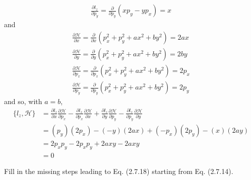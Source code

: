 \documentclass[../principles-of-quantum-mechanics.tex]{subfiles}
\begin{document}
\begin{questions}
\begin{solution}
\begin{gather*}
				\frac{\partial l_z}{\partial p_y} = \frac{\partial}{\partial p_y}(xp_y - yp_x) = x
			\end{gather*}
			and
			\begin{gather*}
				\frac{\partial \mathcal{H}}{\partial x} = \frac{\partial}{\partial x}(p_x^2 + p_y^2 + ax^2 + by^2) = 2ax \\
				\frac{\partial \mathcal{H}}{\partial y} = \frac{\partial}{\partial y}(p_x^2 + p_y^2 + ax^2 + by^2) = 2by \\
				\frac{\partial \mathcal{H}}{\partial p_x} = \frac{\partial}{\partial p_x}(p_x^2 + p_y^2 + ax^2 + by^2) = 2p_x \\
				\frac{\partial \mathcal{H}}{\partial p_y} = \frac{\partial}{\partial p_y}(p_x^2 + p_y^2 + ax^2 + by^2) = 2p_y
			\end{gather*}
			and so, with $a = b$,
			\begin{align*}
				\{l_z, \mathcal{H}\} &= \frac{\partial l_z}{\partial x}\frac{\partial\mathcal{H}}{\partial p_x} - \frac{\partial l_z}{\partial p_x}\frac{\partial\mathcal{H}}{\partial x} + \frac{\partial l_z}{\partial y}\frac{\partial\mathcal{H}}{\partial p_y} - \frac{\partial l_z}{\partial p_y}\frac{\partial\mathcal{H}}{\partial y} \\
				&= (p_y)(2p_x) - (-y)(2ax) + (-p_x)(2p_y) - (x)(2ay) \\
				&= 2p_xp_y - 2p_xp_y + 2axy - 2axy \\
				&= 0
			\end{align*}
		\end{solution}
	
		\question Fill in the missing steps leading to Eq. (2.7.18) starting from Eq. (2.7.14).
		

\end{questions}
\end{document}
